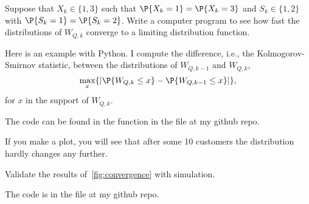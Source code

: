 \begin{exercise}
 Suppose that $X_k\in\{1,3\}$ such that $\P{X_k=1}=\P{X_k=3}$ and
 $S_k\in\{1,2\}$ with $\P{S_k=1}=\P{S_k=2}$. Write a computer program
 to see how fast the distributions of $W_{Q,k}$ converge to a limiting distribution function.
\begin{solution}
 Here is an example with Python.
 I compute the difference, i.e., the Kolmogorov-Smirnov statistic, between the distributions of $W_{Q,k-1}$ and $W_{Q,k}$,
\begin{equation*}
 \max_x\{ |\P{W_{Q,k}\leq x} - \P{W_{Q,k-1}\leq x}|\},
\end{equation*}
for $x$ in the support of $W_{Q,k}$. 

The code can be found in the  function in the file  at
my github repo.

If you make a plot, you will see that after some 10 customers the distribution hardly changes any further. 

\end{solution}
 \end{exercise}

\begin{exercise}
 Validate the results of~\cref{fig:convergence} with simulation.
\begin{solution}
 The code is in the file  at my github repo.
\end{solution}
\end{exercise}



